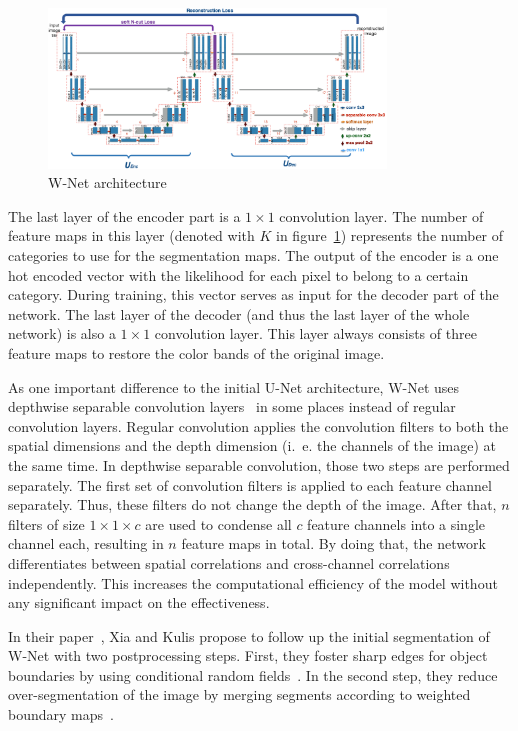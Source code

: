 \begin{figure}[h]
    \centering
    \includegraphics[width=0.8\textwidth]{images/w-net-architecture}
    \caption{W-Net architecture~\cite{wnet17}}
    \label{fig:wnet_architecture}
\end{figure}

The last layer of the encoder part is a $1\times 1$ convolution layer. The number of feature maps in this layer (denoted with $K$ in figure~\ref{fig:wnet_architecture}) represents the number of categories to use for the segmentation maps. The output of the encoder is a one hot encoded vector with the likelihood for each pixel to belong to a certain category. During training, this vector serves as input for the decoder part of the network. The last layer of the decoder (and thus the last layer of the whole network) is also a $1\times 1$ convolution layer. This layer always consists of three feature maps to restore the color bands of the original image.

As one important difference to the initial U-Net architecture, W-Net uses depthwise separable convolution layers~\cite{depthwise_conv17} in some places instead of regular convolution layers. Regular convolution applies the convolution filters to both the spatial dimensions and the depth dimension (i.~e. the channels of the image) at the same time. In depthwise separable convolution, those two steps are performed separately. The first set of convolution filters is applied to each feature channel separately. Thus, these filters do not change the depth of the image. After that, $n$ filters of size $1\times 1\times c$ are used to condense all $c$ feature channels into a single channel each, resulting in $n$ feature maps in total. By doing that, the network differentiates between spatial correlations and cross-channel correlations independently. This increases the computational efficiency of the model without any significant impact on the effectiveness.

In their paper~\cite{wnet17}, Xia and Kulis propose to follow up the initial segmentation of W-Net with two postprocessing steps. First, they foster sharp edges for object boundaries by using conditional random fields~\cite{crf17}. In the second step, they reduce over-segmentation of the image by merging segments according to weighted boundary maps~\cite{hierarchy_imgseg11}.

